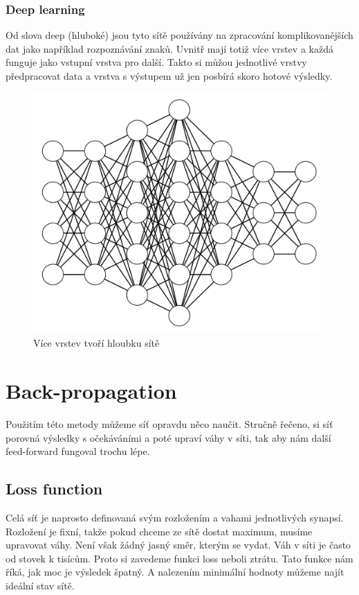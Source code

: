 \documentclass[12pt,a4paper]{report}
\begin{document}
		\subsection{Deep learning}
		Od slova deep (hluboké) jsou tyto sítě používány na zpracování komplikovanějších dat jako například rozpoznávání znaků. Uvnitř mají totiž více vrstev a každá funguje jako vstupní vrstva pro další. Takto si můžou jednotlivé vrstvy předpracovat data a vrstva s výstupem už jen posbírá skoro hotové výsledky.
		\begin{figure}[h]
			\centering
			\includegraphics[width=15cm]{images/nn4-4-5-6-4-3-3}
			\caption{Více vrstev tvoří hloubku sítě}
		\end{figure}
\chapter{Back-propagation}
Použitím této metody můžeme síť opravdu něco naučit. Stručně řečeno, si síť porovná výsledky s očekáváními a poté upraví váhy v síti, tak aby nám další feed-forward fungoval trochu lépe.
	\section{Loss function}
	Celá síť je naprosto definovaná svým rozložením a vahami jednotlivých synapsí. Rozložení je fixní, takže pokud chceme ze sítě dostat maximum, musíme upravovat váhy. Není však žádný jasný směr, kterým se vydat. Váh v síti je často od stovek k tisícům. Proto si zavedeme funkci loss neboli ztrátu. Tato funkce nám říká, jak moc je výsledek špatný. A nalezením minimální hodnoty můžeme najít ideální stav sítě.
\end{document}
